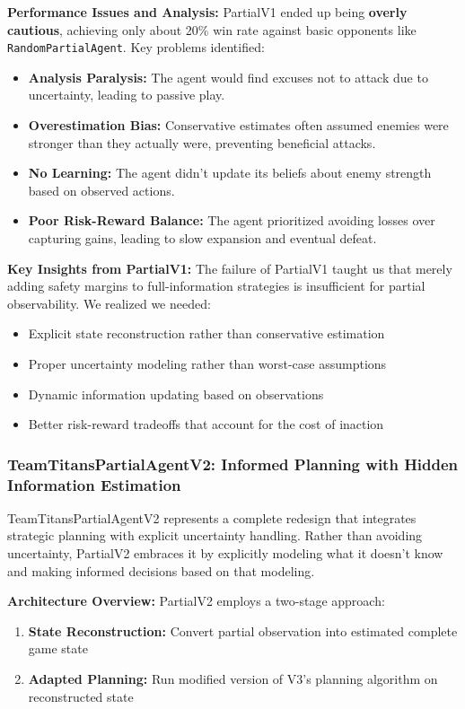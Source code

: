 \documentclass[conference]{IEEEtran}
\begin{document}
\textbf{Performance Issues and Analysis:} PartialV1 ended up being \textbf{overly cautious}, achieving only about 20\% win rate against basic opponents like \texttt{RandomPartialAgent}. Key problems identified:

\begin{itemize}
\item \textbf{Analysis Paralysis:} The agent would find excuses not to attack due to uncertainty, leading to passive play.
\item \textbf{Overestimation Bias:} Conservative estimates often assumed enemies were stronger than they actually were, preventing beneficial attacks.
\item \textbf{No Learning:} The agent didn't update its beliefs about enemy strength based on observed actions.
\item \textbf{Poor Risk-Reward Balance:} The agent prioritized avoiding losses over capturing gains, leading to slow expansion and eventual defeat.
\end{itemize}

\textbf{Key Insights from PartialV1:} The failure of PartialV1 taught us that merely adding safety margins to full-information strategies is insufficient for partial observability. We realized we needed:
\begin{itemize}
\item Explicit state reconstruction rather than conservative estimation
\item Proper uncertainty modeling rather than worst-case assumptions
\item Dynamic information updating based on observations
\item Better risk-reward tradeoffs that account for the cost of inaction
\end{itemize}

\subsubsection{TeamTitansPartialAgentV2: Informed Planning with Hidden Information Estimation}

TeamTitansPartialAgentV2 represents a complete redesign that integrates strategic planning with explicit uncertainty handling. Rather than avoiding uncertainty, PartialV2 embraces it by explicitly modeling what it doesn't know and making informed decisions based on that modeling.

\textbf{Architecture Overview:} PartialV2 employs a two-stage approach:
\begin{enumerate}
\item \textbf{State Reconstruction:} Convert partial observation into estimated complete game state
\item \textbf{Adapted Planning:} Run modified version of V3's planning algorithm on reconstructed state
\end{enumerate}
\end{document}
